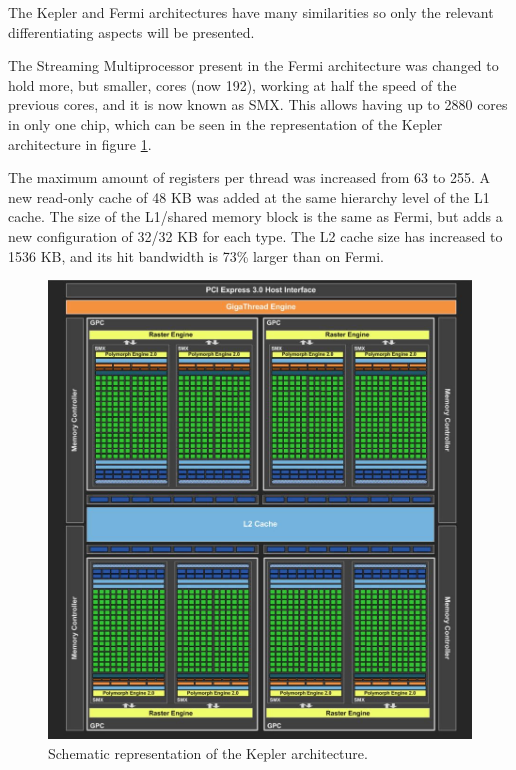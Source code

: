 The Kepler and Fermi architectures have many similarities so only the relevant differentiating aspects will be presented.

The Streaming Multiprocessor present in the Fermi architecture was changed to hold more, but smaller, \cuda cores (now 192), working at half the speed of the previous \cuda cores, and it is now known as SMX. This allows having up to 2880 \cuda cores in only one chip, which can be seen in the representation of the Kepler architecture in figure \ref{fig:kepler}.

The maximum amount of registers per \cuda thread was increased from 63 to 255. A new read-only cache of 48 KB was added at the same hierarchy level of the L1 cache. The size of the L1/shared memory block is the same as Fermi, but adds a new configuration of 32/32 KB for each type. The L2 cache size has increased to 1536 KB, and its hit bandwidth is 73\% larger than on Fermi.

\begin{figure}[!htp]
	\begin{center}
		\includegraphics[scale=0.4]{../../common/img/kepler_arch.jpg}
		\caption{Schematic representation of the \nvidia Kepler architecture.}
		\label{fig:kepler}
	\end{center}
\end{figure}

